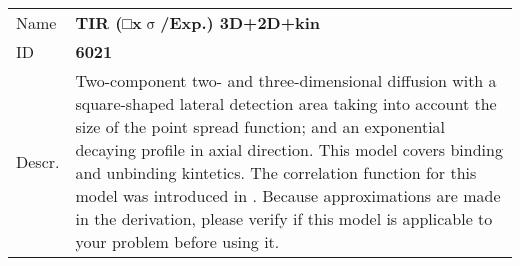 \noindent \begin{tabular}{lp{}}
Name & \textbf{TIR (□x$\upsigma$/Exp.) 3D+2D+kin} \\ 
ID & \textbf{6021} \\ 
Descr. &  Two-component two- and three-dimensional diffusion with a square-shaped lateral detection area taking into account the size of the point spread function; and an exponential decaying profile in axial direction. This model covers binding and unbinding kintetics.  \newline 
The correlation function for this model was introduced in \cite{Ries2008}. Because approximations are made in the derivation, please verify if this model is applicable to your problem before using it.
\end{tabular}
\vspace{2em}


